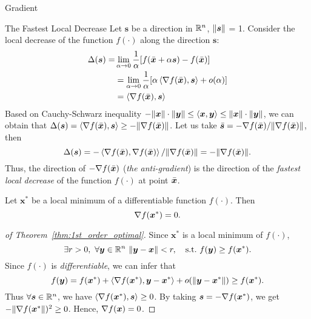 \begin{note}{Gradient}
    \begin{colorboxnote}{The Fastest Local Decrease}
        Let \(\bm{s}\) be a direction in \(\mathbb{R}^n\), \(\norm{\bm{s}}\) = 1. Consider the local decrease of the function \(f(\cdot)\) along the direction \(\bm{s}\):
        \[
            \begin{aligned}
                \Delta(\bm{s}) = &\lim_{\alpha \to 0} \frac{1}{\alpha} [f(\bar{\bm{x}} + \alpha \bm{s}) - f(\bar{\bm{x}})]\\
                &= \lim_{\alpha \to 0}\frac{1}{\alpha}[\alpha \left\langle \nabla f(\bar{\bm{x}}), \bm{s} \right\rangle + o(\alpha)]\\
                &= \left\langle \nabla f(\bar{\bm{x}}), \bm{s} \right\rangle
            \end{aligned}
        \] 
        Based on Cauchy-Schwarz inequality \( -\norm{\bm{x}}\cdot\norm{\bm{y}} \le \left\langle \bm{x}, \bm{y} \right\rangle \le \norm{\bm{x}}\cdot\norm{\bm{y}} \), 
        we can obtain that \(\Delta(\bm{s}) = \left\langle \nabla f(\bar{\bm{x}}), \bm{s} \right\rangle \ge -\norm{\nabla f(\bar{\bm{x}})}\). 
        Let us take \(\bar{\bm{s}} = -\nabla f(\bar{\bm{x}}) / \norm{\nabla f(\bar{\bm{x}})}\), then
        \[
            \Delta(\bm{s}) = -\left\langle \nabla f(\bar{\bm{x}}), \nabla f(\bar{\bm{x}}) \right\rangle / \norm{\nabla f(\bar{\bm{x}})} = - \norm{\nabla f(\bar{\bm{x}})}.
        \]
        Thus, the direction of \(-\nabla f(\bar{\bm{x}})\) (\emph{the anti-gradient}) is the direction of the \emph{fastest local decrease} of the function \(f(\cdot)\) at point \(\bar{\bm{x}}\).
    \end{colorboxnote}
\end{note}

\begin{thm}\label{thm:1st_order_optimal}
    Let \(\bm{x}^*\) be a local minimum of a differentiable function \(f(\cdot)\). Then
    \begin{equation}\label{eq:1st_order_optimal}
        \nabla f(\bm{x}^*) = 0.
    \end{equation}
\end{thm}

\begin{proof}[of Theorem~\ref{thm:1st_order_optimal}]
    Since \(\bm{x}^*\) is a local minimum of \(f(\cdot)\),
    \[
      \exists r > 0,~\forall \bm{y} \in \mathbb{R}^n ~ \norm{\bm{y} - \bm{x}} < r,  \quad \text{s.t.}~ f(\bm{y}) \ge f(\bm{x}^*).
    \] 
    Since \(f(\cdot)\) is \emph{differentiable}, we can infer that
    \[
        f(\bm{y}) = f(\bm{x}^*) + \left\langle \nabla f(\bm{x}^*), \bm{y} - \bm{x}^* \right\rangle + o(\norm{\bm{y} - \bm{x}^*}) \ge f(\bm{x}^*).
    \]
    Thus \(\forall \bm{s} \in \mathbb{R}^n\), we have \(\left\langle \nabla f(\bm{x}^*), \bm{s} \right\rangle \ge 0\). By taking \(\bm{s} = -\nabla f(\bm{x}^*)\), 
    we get \(-\norm{\nabla f(\bm{x}^*})^2 \ge 0\). Hence, \(\nabla f(\bm{x}) = 0\).
\end{proof}

